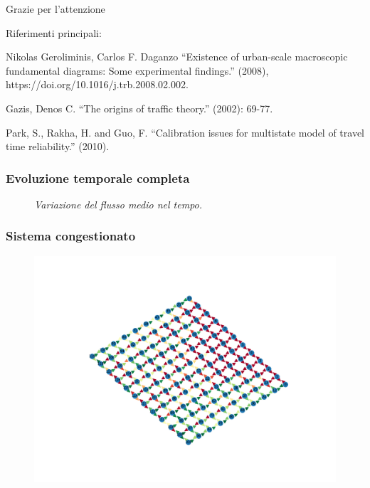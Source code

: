 \documentclass[
	11pt, %
]{beamer}
\begin{document}

\begin{frame}[plain] %
	\begin{center}
		{\Huge Grazie per l'attenzione}
		
		\bigskip\bigskip %
		
		{\LARGE Riferimenti principali:}
		
		\bigskip
		\small

		Nikolas Geroliminis, Carlos F. Daganzo ``Existence of urban-scale macroscopic fundamental diagrams: Some experimental findings.'' (2008), https://doi.org/10.1016/j.trb.2008.02.002.
		
		\bigskip
		
		Gazis, Denos C. ``The origins of traffic theory.'' (2002): 69-77.
		
		\bigskip
		
		Park, S., Rakha, H. and Guo, F. ``Calibration issues for multistate model of travel time reliability.'' (2010).
	\end{center}
\end{frame}

\begin{frame}[plain]{}
\end{frame}

\begin{frame}
	\frametitle{Evoluzione temporale completa}
	\centering
	\begin{figure}[H]
		\caption{\emph{Variazione del flusso medio nel tempo.}}
		\end{figure}
\end{frame}

\begin{frame}
	\frametitle{Sistema congestionato}
	\centering
	\begin{figure}
		\includegraphics[width=.8\textwidth, trim={12.5cm 8cm 10cm 8cm},clip]{congested_flow.png}
	\end{figure}
\end{frame}
\end{document}
